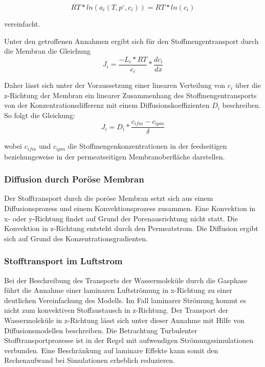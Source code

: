 \begin{normalsize}
\begin{LARGE}
\begin{equation}
RT*ln(a_{i}(T,p^\circ,c_{i})) = RT*ln(c_{i})
\end{equation}

vereinfacht.

Unter den getroffenen Annahmen ergibt sich für den Stoffmengentransport durch die Membran die Gleichung
\begin{equation}
J_{i} = \frac{-L_{i}*RT}{c_{i}} * \frac{d c_{i}}{dx}
\end{equation}

Daher lässt sich unter der Voraussetzung einer linearen Verteilung von $c_{i}$ über die z-Richtung der Membran ein linearer Zusammenhang des Stoffmengentransports von der Konzentrationsdifferenz mit einem Diffusionskoeffizienten $D_{i}$ beschreiben. So folgt die Gleichung:
\begin{equation}
J_{i} = D_{i} * \dfrac{c_{ifm}-c_{ipm}}{\delta}
\end{equation}

wobei $c_{ifm}$ und $c_{ipm}$ die Stoffmengenkonzentrationen in der feedseitigen beziehungsweise in der permeatseitigen Membranoberfläche darstellen.


\subsubsection{Diffusion durch Poröse Membran}

Der Stofftransport durch die poröse Membran setzt sich aus einem Diffusionsprozess und einem Konvektionsprozess zusammen. Eine Konvektion in x- oder y-Richtung findet auf Grund der Porenausrichtung nicht statt. Die Konvektion in z-Richtung entsteht durch den Permeatstrom. Die Diffusion ergibt sich auf Grund des Konzentrationsgradienten. 

\subsubsection{Stofftransport im Luftstrom}

Bei der Beschreibung des Transports der Wassermoleküle durch die Gasphase führt die Annahme einer laminaren Luftströmung in x-Richtung zu einer deutlichen Vereinfachung des Modells. Im Fall laminarer Strömung kommt es nicht zum konvektiven Stoffaustausch in z-Richtung. Der Transport der Wassermoleküle in z-Richtung lässt sich unter dieser Annahme mit Hilfe von Diffusionsmodellen beschreiben.
Die Betrachtung Turbulenter Stofftransportprozesse ist in der Regel mit aufwendigen Strömungssimulationen verbunden. Eine Beschränkung auf laminare Effekte kann somit den Rechenaufwand bei Simulationen erheblich reduzieren. 


\end{LARGE}
\end{normalsize}
